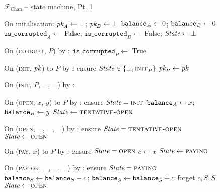\begin{figure}[H]
  \begin{systembox}{$\mathcal{F}_{\mathrm{Chan}}$ -- state machine, Pt. 1}
    \begin{algorithmic}[1]
      \State On initalisation:
      \Indent
        \State $\textit{pk}_{A} \gets \bot$; $\textit{pk}_{B} \gets \bot$
        \State $\texttt{balance}_{A} \gets 0$; $\texttt{balance}_{B} \gets 0$
        \State $\texttt{is\_corrupted}_A \gets$ False; $\texttt{is\_corrupted}_B
        \gets$ False;
        \State $\itistate \gets \bot$
      \EndIndent
      \Statex

      \State On (\textsc{corrupt}, $P$) by \adversary:
      \Indent
        \State $\texttt{is\_corrupted}_P \gets$ True
      \EndIndent
      \Statex

      \State On (\textsc{init}, $\textit{pk}_{}$) to $P$ by \environment:
      \Indent
        \State ensure $\itistate \in \{\bot, \textsc{init}_{\bar{P}}\}$
        \State $\textit{pk}_{P} \gets \textit{pk}_{}$
      \EndIndent
      \Statex

      \State On (\textsc{init}, $P$, \_, \_) by \adversary: 
      \Indent
      \EndIndent
      \Statex

      \State On (\textsc{open}, $x$, $y$) to $P$ by
      \environment:
      \Indent
        \State ensure $\itistate = \textsc{init}$
        \State $\texttt{balance}_{A} \gets x$; $\texttt{balance}_{B} \gets y$
        \State $\itistate \gets \textsc{tentative-open}$
      \EndIndent
      \Statex

      \State On (\textsc{open}, \_, \_, \_) by \adversary:
      \Indent
        \State ensure $\itistate = \textsc{tentative-open}$
        \State $\itistate \gets \textsc{open}$
      \EndIndent
      \Statex

      \State On (\textsc{pay}, $x$) to $P$ by \environment:
      \Indent
        \State ensure $\itistate = \textsc{open}$
        \State $c \gets x$
        \State $\itistate \gets \textsc{paying}$
      \EndIndent
      \Statex

      \State On (\textsc{pay ok}, \_, \_, \_) by \adversary:
      \Indent
        \State ensure $\itistate = \textsc{paying}$
        \State $\texttt{balance}_{S} \gets \texttt{balance}_{S} - c$; $\texttt{balance}_{\bar{S}} \gets
        \texttt{balance}_{\bar{S}} + c$
        \State forget $c, S, \bar{S}$
        \State $\itistate \gets \textsc{open}$
      \EndIndent
    \end{algorithmic}
  \end{systembox}
  \caption{}
  \label{code:functionality:state-machine-1}
\end{figure}

